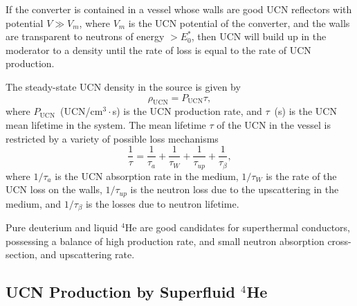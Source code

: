 If the converter is contained in a vessel whose walls are good UCN
reflectors with potential $V \gg V_m$, where $V_m$ is the UCN potential
of the converter, and the walls are transparent to neutrons of
energy $> E_0^*$, then UCN will build up in the moderator to a density
until the rate of loss is equal to the rate of UCN production.


The steady-state UCN density in the source is given by
\begin{equation}
\label{ucndensity}
\rho_{\text{UCN}}=P_{\text{UCN}} \tau,
\end{equation}
where $P_{\text{UCN}}$~(UCN/cm$^3 \cdot$s) is the UCN production rate,
and $\tau$~(s) is the UCN mean lifetime in the system.  The mean
lifetime $\tau$ of the UCN in the vessel is restricted by a variety of
possible loss mechanisms
\begin{equation}
\frac{1}{\tau} = \frac{1}{\tau_a}+ \frac{1}{\tau_W}+\frac{1}{\tau_{up}}+\frac{1}{\tau_{\beta}},
\end{equation}
where $1/\tau_a$ is the UCN absorption rate in the medium, $1/\tau_W$
is the rate of the UCN loss on the walls, $1/\tau_{up}$ is the neutron
loss due to the upscattering in the medium, and $1/\tau_{\beta}$ is
the losses due to neutron lifetime.

Pure deuterium and liquid $^4$He are good candidates for superthermal
conductors, possessing a balance of high production rate, and small
neutron absorption cross-section, and upscattering rate.


\subsection{UCN Production by Superfluid $^4$He}

